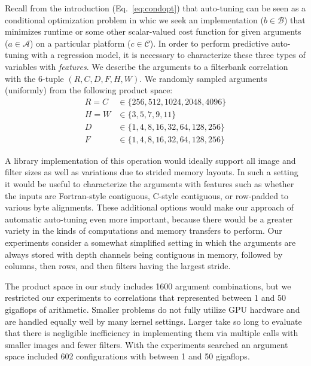 \documentclass{sig-alternate}
\begin{document}
Recall from the introduction (Eq.~\ref{eq:condopt}) that auto-tuning can be seen
as a conditional optimization problem in whic we seek an implementation ($b \in \mathcal{B}$) that minimizes runtime or some other scalar-valued cost function
for given arguments ($a \in \mathcal{A}$) on a particular platform ($c \in \mathcal{C}$).
In order to perform predictive auto-tuning with a regression model,
it is necessary to characterize these
three types of variables with {\em features}.
We describe the arguments to a filterbank correlation with the 6-tuple
$(R, C, D, F, H, W)$.
We randomly sampled arguments (uniformly) from the following product space:
\begin{align*}
R = C & \in \{ 256, 512, 1024, 2048, 4096 \} \\
H = W & \in \{ 3, 5, 7, 9, 11 \} \\
D &  \in \{1, 4, 8, 16, 32, 64, 128, 256 \} \\
F &  \in \{1, 4, 8, 16, 32, 64, 128, 256 \}
\end{align*}

A library implementation of this operation would ideally support all image and
filter sizes as well as variations due
to strided memory layouts. In such a setting it would be useful to characterize
the arguments with
features such as whether the inputs are Fortran-style contiguous, C-style contiguous, or row-padded to various byte alignments.
These additional options would make our
approach of automatic auto-tuning even more important, because there would be
a greater variety in the kinds of computations and memory transfers to
perform.
Our experiments consider a somewhat simplified setting in which the arguments are always stored
with depth channels being contiguous in memory, followed by columns, then rows, and then filters having the largest stride.


The product space in our study
includes 1600 argument combinations, but we restricted our experiments to correlations that
represented between 1 and 50 gigaflops of arithmetic.
Smaller problems do not fully utilize GPU hardware and are handled equally well by many kernel settings.
Larger take so long to evaluate that there is negligible
inefficiency in implementing them via multiple calls with smaller images and fewer filters.
With the experiments searched an argument space included 602 configurations with between 1 and 50 gigaflops.
\end{document}
